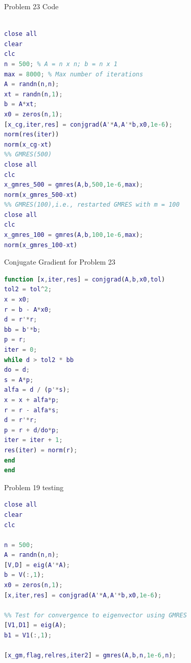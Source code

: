 \documentclass[12pt]{article}
\begin{document}
\large{Problem 23 Code}
\begin{lstlisting}[language=MATLAB]
%% CG on the normal equations

close all
clear
clc
n = 500; % A = n x n; b = n x 1
max = 8000; % Max number of iterations
A = randn(n,n);
xt = randn(n,1);
b = A*xt;
x0 = zeros(n,1);
[x_cg,iter,res] = conjgrad(A'*A,A'*b,x0,1e-6);
norm(res(iter))
norm(x_cg-xt)
%% GMRES(500)
close all
clc
x_gmres_500 = gmres(A,b,500,1e-6,max);
norm(x_gmres_500-xt)
%% GMRES(100),i.e., restarted GMRES with m = 100
close all
clc
x_gmres_100 = gmres(A,b,100,1e-6,max);
norm(x_gmres_100-xt)
\end{lstlisting}

\large{Conjugate Gradient for Problem 23}
\begin{lstlisting}[language=MATLAB]
function [x,iter,res] = conjgrad(A,b,x0,tol)
tol2 = tol^2;
x = x0;
r = b - A*x0;
d = r'*r; 
bb = b'*b;
p = r;
iter = 0;
while d > tol2 * bb
do = d;
s = A*p;
alfa = d / (p'*s);
x = x + alfa*p;
r = r - alfa*s;
d = r'*r;
p = r + d/do*p;
iter = iter + 1;
res(iter) = norm(r);
end
end
\end{lstlisting}

\large{Problem 19 testing}
\begin{lstlisting}[language=MATLAB]
%% Test for convergence to eigenvector using CG
close all
clear
clc

n = 500;
A = randn(n,n);
[V,D] = eig(A'*A);
b = V(:,1);
x0 = zeros(n,1);
[x,iter,res] = conjgrad(A'*A,A'*b,x0,1e-6);

%% Test for convergence to eigenvector using GMRES
[V1,D1] = eig(A);
b1 = V1(:,1);

[x_gm,flag,relres,iter2] = gmres(A,b,n,1e-6,n);
\end{lstlisting}
\end{document}
